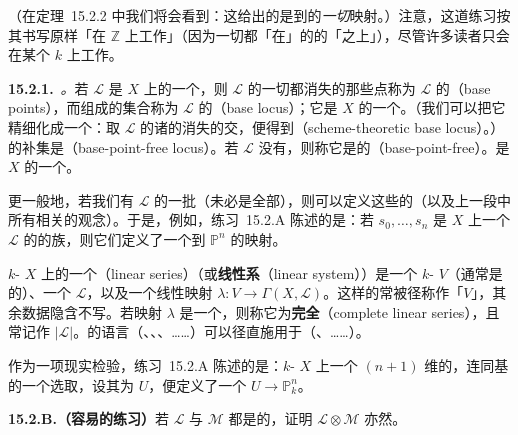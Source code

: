 （在\mbox{定理~15.2.2} 中我们将会看到：这给出的是到\trProjectiveSpace{}的\emph{一切}映射。）注意，这道练习按其书写原样「在 $\mathbb{Z}$ 上工作」（因为一切\trMorphism{}都「在」\trScheme{}的\trCategory{}的\trFinalObject{}「之上」），尽管许多读者只会在某个\trField{} $k$ 上工作。

\textbf{15.2.1.}\ \emph{\trhDefinition{}。}\quad 若 $\mathscr{L}$ 是 $X$ 上的一个\trInvertibleSheaf，则 $\mathscr{L}$ 的一切\trGlobalSections{}都消失的那些点称为 $\mathscr{L}$ 的\textbf{\trBasePoint}（base points），而\trBasePoint{}组成的集合称为 $\mathscr{L}$ 的\textbf{\trBaseLocus}（base locus）；它是 $X$ 的一个\trClosedSubset。（我们可以把它精细化成一个\trClosedSubscheme：取 $\mathscr{L}$ 的诸\trSection{}的消失\trLocus{}的\trSchemeTheoretic{}交，便得到\textbf{\trSchemeTheoretic{}\trBaseLocus}（scheme-theoretic base locus）。）\trBaseLocus{}的补集是\textbf{\trBasePointFree\trLocus}（base-point-free locus）。若 $\mathscr{L}$ 没有\trBasePoint，则称它是\textbf{\trBasePointFree}的（base-point-free）。\trBasePointFree\trLocus{}是 $X$ 的一个\trOpenSubset。

更一般地，若我们有 $\mathscr{L}$ 的一批\trGlobalSections（未必是全部），则可以定义这些\trSection{}的\trBasePoint（以及上一段中所有相关的观念）。于是，例如，\mbox{练习~15.2.A} 陈述的是：若 $s_0,\dots,s_n$ 是 $X$ 上一个\trInvertibleSheaf{} $\mathscr{L}$ 的\trBasePointFree{}的\trGlobalSections{}族，则它们定义了一个到 $\mathbb{P}^n$ 的映射。

$k$-\trScheme{} $X$ 上的一个\textbf{\trLinearSystem}（linear series）（或\textbf{线性系}（linear system））是一个 $k$-\trVectorSpace{} $V$（通常是\trFiniteDimensional{}的）、一个\trInvertibleSheaf{} $\mathscr{L}$，以及一个线性映射 $\lambda\colon V\to\Gamma(X,\mathscr{L})$。这样的\trLinearSystem{}常被径称作「$V$」，其余数据隐含不写。若映射 $\lambda$ 是一个\trIsomorphism，则称它为\textbf{完全\trLinearSystem}（complete linear series），且常记作 $|\mathscr{L}|$。\trBasePoint{}的语言（\trBasePointFree、\trBaseLocus、\trSchemeTheoretic{}\trBaseLocus、……）可以径直施用于\trLinearSystem{}（\trBasePointFree\trLinearSystem、……）。

作为一项现实检验，\mbox{练习~15.2.A} 陈述的是：$k$-\trScheme{} $X$ 上一个 $(n+1)$ 维的\trLinearSystem，连同基的一个选取，设其\trBasePointFree\trLocus{}为 $U$，便定义了一个\trMorphism{} $U\to\mathbb{P}^n_k$。

\textbf{15.2.B.（容易的练习）}\quad 若 $\mathscr{L}$ 与 $\mathscr{M}$ 都是\trBasePointFree{}的\trInvertibleSheaf，证明 $\mathscr{L}\otimes\mathscr{M}$ 亦然。


